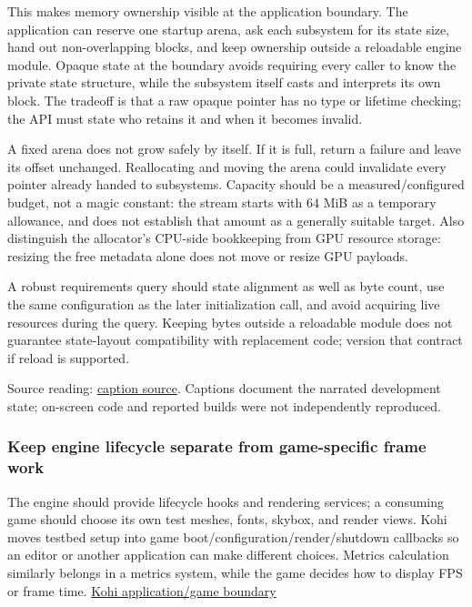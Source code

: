 This makes memory ownership visible at the application boundary. The application can reserve one startup arena, ask each subsystem for its state size, hand out non-overlapping blocks, and keep ownership outside a reloadable engine module. Opaque  state at the boundary avoids requiring every caller to know the private state structure, while the subsystem itself casts and interprets its own block. The tradeoff is that a raw opaque pointer has no type or lifetime checking; the API must state who retains it and when it becomes invalid.

A fixed arena does not grow safely by itself. If it is full, return a failure and leave its offset unchanged. Reallocating and moving the arena could invalidate every pointer already handed to subsystems. Capacity should be a measured/configured budget, not a magic constant: the stream starts with 64 MiB as a temporary allowance, and does not establish that amount as a generally suitable target. Also distinguish the allocator's CPU-side bookkeeping from GPU resource storage: resizing the free metadata alone does not move or resize GPU payloads.

A robust requirements query should state alignment as well as byte count, use the same configuration as the later initialization call, and avoid acquiring live resources during the query. Keeping bytes outside a reloadable module does not guarantee state-layout compatibility with replacement code; version that contract if reload is supported.

Source reading: \href{https://www.youtube.com/watch?v=3ZFcvBjRFN0}{caption source}. Captions document the narrated development state; on-screen code and reported builds were not independently reproduced.

\subsubsection{Keep engine lifecycle separate from game-specific frame work}\label{05-engine-i-ch013-keep-engine-lifecycle-separate-from-game-specific-frame-work}

\hypertarget{05-engine-i-ch013-keep-engine-lifecycle-separate-from-game-specific-frame-work}{}

The engine should provide lifecycle hooks and rendering services; a consuming game should choose its own test meshes, fonts, skybox, and render views. Kohi moves testbed setup into game boot/configuration/render/shutdown callbacks so an editor or another application can make different choices. Metrics calculation similarly belongs in a metrics system, while the game decides how to display FPS or frame time. \href{https://www.youtube.com/watch?v=UWaUUhOFCec}{Kohi application/game boundary}

